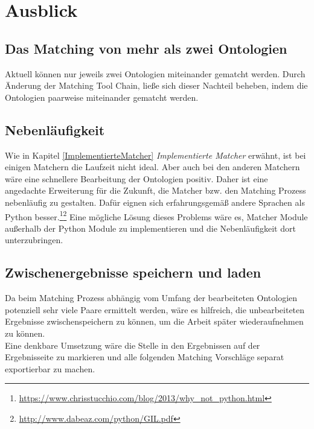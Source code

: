 %
\chapter{Ausblick}
\label{chap:outlook}      

\section{Das Matching von mehr als zwei Ontologien}
Aktuell können nur jeweils zwei Ontologien miteinander gematcht werden. Durch
Änderung der Matching Tool Chain, ließe sich dieser Nachteil beheben, indem die
Ontologien paarweise miteinander gematcht werden.

\section{Nebenläufigkeit}
Wie in Kapitel \ref{ImplementierteMatcher} \textit{Implementierte Matcher}
erwähnt, ist bei einigen Matchern die Laufzeit nicht ideal. Aber auch bei den anderen Matchern wäre eine schnellere
Bearbeitung der Ontologien positiv. Daher ist eine angedachte Erweiterung für
die Zukunft, die Matcher bzw.
den Matching Prozess nebenläufig zu gestalten. Dafür eignen sich erfahrungsgemäß
andere Sprachen als Python
besser.\footnote{\url{https://www.chrisstucchio.com/blog/2013/why_not_python.html}}\footnote{\url{http://www.dabeaz.com/python/GIL.pdf}}
Eine mögliche Lösung dieses Problems wäre es, Matcher Module
außerhalb der Python Module zu implementieren und die Nebenläufigkeit dort unterzubringen.

\section{Zwischenergebnisse speichern und laden}
Da beim Matching Prozess abhängig vom Umfang der bearbeiteten Ontologien
potenziell sehr viele Paare ermittelt werden, wäre es hilfreich, die
unbearbeiteten Ergebnisse zwischenspeichern zu können, um die Arbeit später
wiederaufnehmen zu können.\\
Eine denkbare Umsetzung wäre die Stelle in den Ergebnissen auf der
Ergebnisseite zu markieren und alle folgenden Matching Vorschläge separat
exportierbar zu machen.

